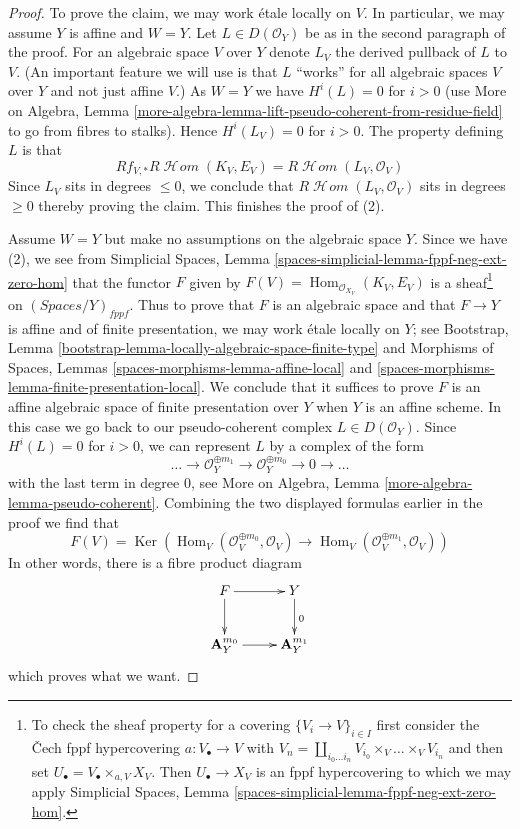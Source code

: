 \documentclass[10pt,a4paper]{amsart}
\theoremstyle{plain}
\theoremstyle{definition}
\theoremstyle{remark}
\numberwithin{equation}{subsection}
\def\Hom{\mathop{\mathrm{Hom}}\nolimits}
\def\SheafHom{\mathop{\mathcal{H}\!\mathit{om}}\nolimits}
\def\Ker{\mathop{\mathrm{Ker}}}
\begin{document}
\begin{proof}
\medskip\noindent
To prove the claim, we may work \'etale locally on $V$.
In particular, we may assume $Y$ is affine and $W = Y$.
Let $L \in D(\mathcal{O}_Y)$ be as in the second paragraph of the proof.
For an algebraic space $V$ over $Y$ denote $L_V$ the derived pullback of
$L$ to $V$. (An important feature we will use is that $L$ ``works'' for all
algebraic spaces $V$ over $Y$ and not just affine $V$.)
As $W = Y$ we have $H^i(L) = 0$ for $i > 0$
(use More on Algebra, Lemma
\ref{more-algebra-lemma-lift-pseudo-coherent-from-residue-field}
to go from fibres to stalks). Hence $H^i(L_V) = 0$ for $i > 0$.
The property defining $L$ is that
$$
Rf_{V, *}R\SheafHom(K_V, E_V) = R\SheafHom(L_V, \mathcal{O}_V)
$$
Since $L_V$ sits in degrees $\leq 0$, we conclude that
$R\SheafHom(L_V, \mathcal{O}_V)$ sits in degrees $\geq 0$
thereby proving the claim. This finishes the proof of (2).

\medskip\noindent
Assume $W = Y$ but make no assumptions on the algebraic space $Y$.
Since we have (2), we see from
Simplicial Spaces, Lemma \ref{spaces-simplicial-lemma-fppf-neg-ext-zero-hom}
that the functor $F$ given by $F(V) = \Hom_{\mathcal{O}_{X_V}}(K_V, E_V)$
is a sheaf\footnote{To check the sheaf property
for a covering $\{V_i \to V\}_{i \in I}$ first consider the
{\v C}ech fppf hypercovering $a : V_\bullet \to V$ with
$V_n = \coprod_{i_0 \ldots i_n} V_{i_0} \times_V \ldots \times_V V_{i_n}$
and then set $U_\bullet = V_\bullet \times_{a, V} X_V$. Then
$U_\bullet \to X_V$ is an fppf hypercovering to which we may
apply Simplicial Spaces, Lemma
\ref{spaces-simplicial-lemma-fppf-neg-ext-zero-hom}.}
on $(\textit{Spaces}/Y)_{fppf}$. Thus to prove that $F$
is an algebraic space and that $F \to Y$ is affine and of
finite presentation, we may work \'etale locally on $Y$; see
Bootstrap, Lemma \ref{bootstrap-lemma-locally-algebraic-space-finite-type}
and
Morphisms of Spaces, Lemmas \ref{spaces-morphisms-lemma-affine-local} and
\ref{spaces-morphisms-lemma-finite-presentation-local}. We conclude
that it suffices to prove $F$ is an affine algebraic space of
finite presentation over $Y$ when $Y$ is an affine scheme. In this
case we go back to our pseudo-coherent complex $L \in D(\mathcal{O}_Y)$.
Since $H^i(L) = 0$ for $i > 0$, we can represent $L$ by a complex
of the form
$$
\ldots \to \mathcal{O}_Y^{\oplus m_1} \to \mathcal{O}_Y^{\oplus m_0}
\to 0 \to \ldots
$$
with the last term in degree $0$, see More on Algebra, Lemma
\ref{more-algebra-lemma-pseudo-coherent}. Combining the two displayed formulas
earlier in the proof we find that
$$
F(V) =
\Ker(
\Hom_V(\mathcal{O}_V^{\oplus m_0}, \mathcal{O}_V)
\to 
\Hom_V(\mathcal{O}_V^{\oplus m_1}, \mathcal{O}_V)
)
$$
In other words, there is a fibre product diagram
$$
\xymatrix{
F \ar[d] \ar[r] & Y \ar[d]^0 \\
\mathbf{A}_Y^{m_0} \ar[r] & \mathbf{A}_Y^{m_1}
}
$$
which proves what we want.
\end{proof}
\end{document}
